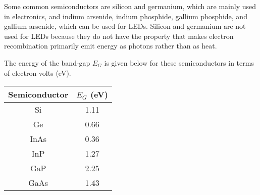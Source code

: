 
Some common semiconductors are silicon and germanium, which are mainly used in electronics, and indium arsenide, indium phosphide, gallium phosphide, and gallium arsenide, which can be used for LEDs. Silicon and germanium are not used for LEDs because they do not have the property that makes electron recombination primarily emit energy as photons rather than as heat.

The energy of the band-gap $E_G$ is given below for these semiconductors in terms of electron-volts (eV).

\begin{center}
	\begin{tabular}{c|c}
		Semiconductor & $E_G$ (eV) \\
		\hline
		Si	& 1.11 \\
		Ge & 0.66 \\
		InAs & 0.36 \\
		InP & 1.27 \\
		GaP	& 2.25 \\
		GaAs & 1.43 \\
	\end{tabular}
\end{center}

